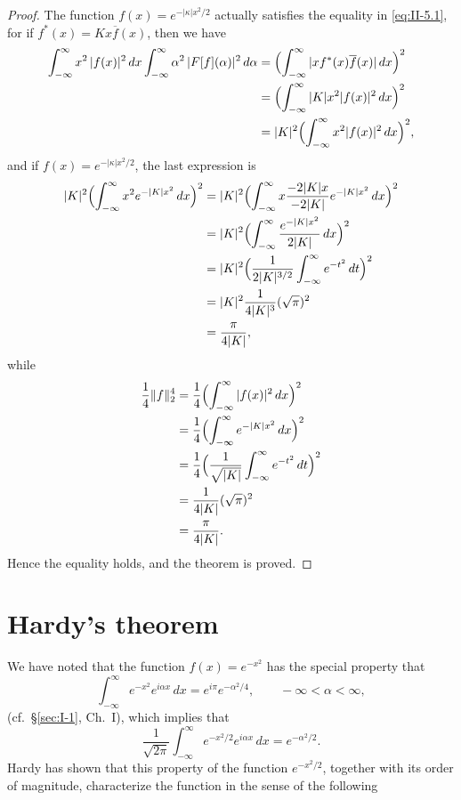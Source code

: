 \begin{proof}
The function $f(x)=e^{-|\kappa|x^{2}/2}$ actually satisfies the equality in \eqref{eq:II-5.1}, for if $f^{*}(x)=K x\overline{f}(x)$, then we have
\[
\begin{aligned}
\int_{-\infty}^{\infty}x^{2}\,|f(x)|^{2}\,dx
\int_{-\infty}^{\infty}\alpha^{2}\,|F[f](\alpha)|^{2}\,d\alpha &= \Bigl(\int_{-\infty}^{\infty}|x f^{*}(x)\overline{f}(x)|\,dx\Bigr)^{2}\\
&= \Bigl(\int_{-\infty}^{\infty}|K|x^{2}|f(x)|^{2}\,dx\Bigr)^{2}\\
&= |K|^{2}\Bigl(\int_{-\infty}^{\infty}x^{2}|f(x)|^{2}\,dx\Bigr)^{2},
\end{aligned}
\]
and if $f(x)=e^{-|\kappa|x^{2}/2}$, the last expression is
\[
\begin{aligned}
|K|^{2}\Bigl(\int_{-\infty}^{\infty}x^{2}e^{-|K|x^{2}}\,dx\Bigr)^{2} &= |K|^{2}\Bigl(\int_{-\infty}^{\infty}x\frac{-2|K|x}{-2|K|}e^{-|K|x^{2}}\,dx\Bigr)^{2}\\
&= |K|^{2}\Bigl(\int_{-\infty}^{\infty}\frac{e^{-|K|x^{2}}}{2|K|}\,dx\Bigr)^{2}\\
&= |K|^{2}\Bigl(\frac{1}{2|K|^{3/2}}\int_{-\infty}^{\infty}e^{-t^{2}}\,dt\Bigr)^{2}\\
&= |K|^{2}\frac{1}{4|K|^{3}}(\sqrt{\pi})^{2}\\
&= \frac{\pi}{4|K|},
\end{aligned}
\]
while
\[
\begin{aligned}
\frac{1}{4}\|f\|_{2}^{4} &= \frac{1}{4}\Bigl(\int_{-\infty}^{\infty}|f(x)|^{2}\,dx\Bigr)^{2}\\
&= \frac{1}{4}\Bigl(\int_{-\infty}^{\infty}e^{-|K|x^{2}}\,dx\Bigr)^{2}\\
&= \frac{1}{4}\Bigl(\frac{1}{\sqrt{|K|}}\int_{-\infty}^{\infty}e^{-t^{2}}\,dt\Bigr)^{2}\\
&= \frac{1}{4|K|}(\sqrt{\pi})^{2}\\
&= \frac{\pi}{4|K|}.
\end{aligned}
\]
Hence the equality holds, and the theorem is proved.
\end{proof}

\setcounter{section}{5}
\section{Hardy's theorem}
\label{sec:II-6}

We have noted that the function $f(x)=e^{-x^{2}}$ has the special property that
\[
\int_{-\infty}^{\infty}e^{-x^{2}}e^{i\alpha x}\,dx=e^{i\pi}e^{-\alpha^{2}/4},\qquad-\infty<\alpha<\infty,
\]
(cf.\ \S\ref{sec:I-1}, Ch.~I), which implies that
\[
\frac{1}{\sqrt{2\pi}}\int_{-\infty}^{\infty}e^{-x^{2}/2}e^{i\alpha x}\,dx=e^{-\alpha^{2}/2}.
\]
Hardy has shown that this property of the function $e^{-x^{2}/2}$, together with its order of magnitude, characterize the function in the sense of the following

